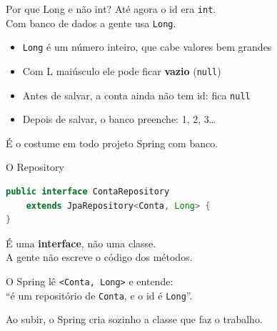 \documentclass[aspectratio=169,11pt]{beamer}
\begin{document}
\begin{frame}{Por que Long e não int?}
  Até agora o id era \texttt{int}.\\
  Com banco de dados a gente usa \texttt{Long}.

  \vspace{0.5em}
  \begin{itemize}
    \item \texttt{Long} é um número inteiro, que cabe valores bem grandes
    \item Com L maiúsculo ele pode ficar \textbf{vazio} (\texttt{null})
    \item Antes de salvar, a conta ainda não tem id: fica \texttt{null}
    \item Depois de salvar, o banco preenche: 1, 2, 3\ldots
  \end{itemize}

  \vspace{0.5em}
  É o costume em todo projeto Spring com banco.
\end{frame}

\begin{frame}[fragile]{O Repository}
\begin{lstlisting}[language=Java,basicstyle=\ttfamily\footnotesize]
public interface ContaRepository
    extends JpaRepository<Conta, Long> {
}
\end{lstlisting}

  \vspace{0.4em}
  É uma \textbf{interface}, não uma classe.\\
  A gente não escreve o código dos métodos.

  \vspace{0.4em}
  O Spring lê \texttt{<Conta, Long>} e entende:\\
  ``é um repositório de \texttt{Conta}, e o id é \texttt{Long}''.

  \vspace{0.4em}
  Ao subir, o Spring cria sozinho a classe que faz o trabalho.
\end{frame}
\end{document}
